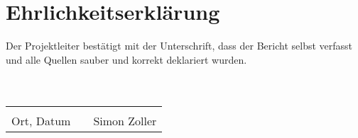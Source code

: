 \section{Ehrlichkeitserklärung} \label{sec:ehrlichkeitserklärung}
Der Projektleiter bestätigt mit der Unterschrift, dass der Bericht selbst verfasst und alle Quellen sauber und korrekt deklariert wurden.\\
\\
\\


\begin{tabular}{lp{22em}l}
 \hspace{3cm}   && \hspace{3cm} \\\cline{1-1}\cline{3-3}
 Ort, Datum     && Simon Zoller
\end{tabular}

\newpage